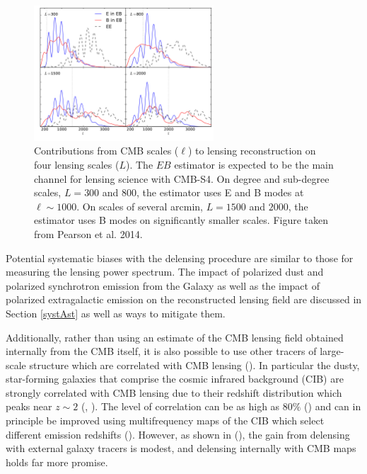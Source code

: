 \begin{figure}[htbp]
\centering
\includegraphics[width=0.60\textwidth]{CMBLensing/signal_contribs.pdf}
\caption{Contributions from CMB scales ($\ell$) to lensing reconstruction on four lensing scales ($L$).  The $EB$ estimator is expected to be the main channel for lensing science with CMB-S4.  On degree and sub-degree scales, $L = 300$ and $800$, the estimator uses E and B modes at $\ell \sim 1000$.  On scales of several arcmin, $L = 1500$ and $2000$, the estimator uses B modes on significantly smaller scales.  Figure taken from Pearson et al. 2014.}
\label{sigCon}
\end{figure}

Potential systematic biases with the delensing procedure are similar to those for measuring the lensing power spectrum. The impact of polarized dust and polarized synchrotron emission from the Galaxy as well as the impact of polarized extragalactic emission on the reconstructed lensing field are discussed in Section \ref{systAst} as well as ways to mitigate them.

Additionally, rather than using an estimate of the CMB lensing field obtained internally from the CMB itself, it is also possible to use other tracers of large-scale structure which are correlated with  CMB lensing (\cite{Smith:2010gu}).  In particular the dusty, star-forming galaxies that comprise the cosmic infrared background (CIB) are strongly correlated with CMB lensing due to their redshift distribution which peaks near $z \sim 2$ (\cite{Sherwin:2015baa}, \cite{Simard:2014aqa}).  The level of correlation can be as high as $80\%$ (\cite{Ade:2013aro}) and can in principle be improved using multifrequency maps of the CIB which select different emission redshifts (\cite{Sherwin:2015baa}). However, as shown in (\cite{Smith:2010gu}), the gain from delensing with external galaxy tracers is modest, and delensing internally with CMB maps holds far more promise.


